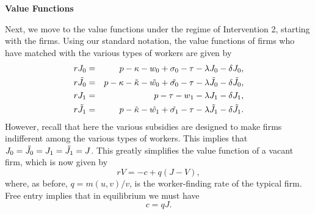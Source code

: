 \documentclass[12pt]{article} %
\theoremstyle{definition}
\begin{document}
\bigskip 

\noindent \textbf{Value Functions}

\noindent Next, we move to the value functions under the regime of Intervention 2, starting with the firms. Using our standard notation, the value functions of firms who have matched with the various types of workers are given by
\begin{eqnarray}
    rJ_0 &=&p-\kappa - w_0 + \sigma_0 - \tau -\lambda J_0 - \delta J_0,\label{eq J0 inter 2} \\
    r\Tilde{J_0} &=& p-\kappa-\Tilde{\kappa}-\Tilde{w_0}+ \Tilde{\sigma_0} - \tau - \lambda \Tilde{J_0} - \delta \Tilde{J_0},\label{eq J0 tilde inter 2}\\
    rJ_1 &=&p-\tau-w_1-\lambda J_1 - \delta J_1, \label{eq J1 inter 2} \\
    r\Tilde{J_1} &=&p-\Tilde{\kappa}-\Tilde{w_1}+ \Tilde{\sigma_1} - \tau-\lambda \Tilde{J_1} - \delta \Tilde{J_1}. \label{eq J1 tilde inter 2}
    \end{eqnarray}
However, recall that here the various subsidies are designed to make firms indifferent among the various types of workers. This implies that $J_0=\Tilde{J_0}=J_1=\Tilde{J_1}=J$. This greatly simplifies the value function of a vacant firm, which is now given by 
\begin{equation}
   rV = -c + q (J-V), \nonumber 
\end{equation}where, as before, $q=m(u,v)/v$, is the worker-finding rate of the typical firm. Free entry implies that in equilibrium we must have  
\begin{equation}
 c = q J.\label{eq free entry intervention 2} 
\end{equation}
\end{document}
